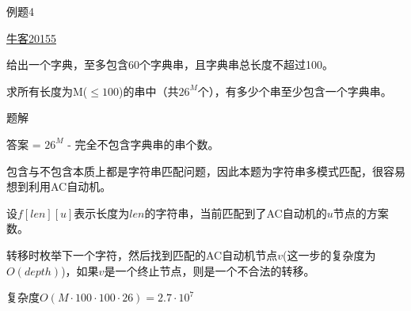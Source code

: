\documentclass{ctexbeamer}		%
\begin{document}
\begin{frame}{例题4}
    
\begin{block}{\href{https://ac.nowcoder.com/acm/problem/20155}{牛客20155}}

给出一个字典，至多包含60个字典串，且字典串总长度不超过100。

求所有长度为M($\leq 100$)的串中（共$26^M$个），有多少个串至少包含一个字典串。

\end{block}

\pause

\begin{block}{题解}

答案 = $26^M$ - 完全不包含字典串的串个数。

\pause

包含与不包含本质上都是字符串匹配问题，因此本题为字符串多模式匹配，很容易想到利用AC自动机。

\pause

设$f[len][u]$表示长度为$len$的字符串，当前匹配到了AC自动机的$u$节点的方案数。

\pause

转移时枚举下一个字符，然后找到匹配的AC自动机节点$v$(这一步的复杂度为$O(depth)$)，如果$v$是一个终止节点，则是一个不合法的转移。

\pause

复杂度$O(M \cdot 100 \cdot 100 \cdot 26) = 2.7\cdot10^7$

\end{block}

\end{frame}
\end{document}
